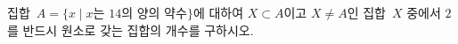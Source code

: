 집합~$A=\{x \mid x$는 $14$의 양의 약수$\}$에 대하여 $X\subset A$이고 $X\ne A$인 집합~$X$ 중에서 $2$를 반드시 원소로 갖는 집합의 개수를 구하시오.
